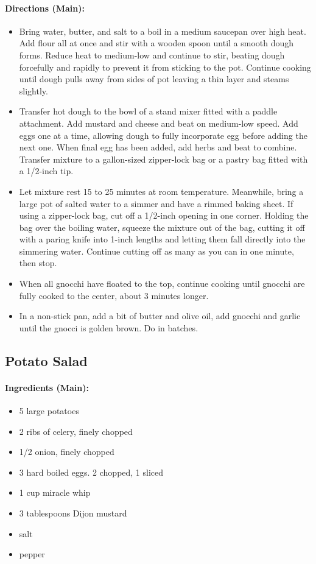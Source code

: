 \documentclass{article}
\begin{document}
\paragraph{Directions (Main):}
\begin{itemize}
    \item Bring water, butter, and salt to a boil in a medium saucepan over high heat. Add flour all at once and stir with a wooden spoon until a smooth dough forms. Reduce heat to medium-low and continue to stir, beating dough forcefully and rapidly to prevent it from sticking to the pot. Continue cooking until dough pulls away from sides of pot leaving a thin layer and steams slightly.
    \item Transfer hot dough to the bowl of a stand mixer fitted with a paddle attachment. Add mustard and cheese and beat on medium-low speed. Add eggs one at a time, allowing dough to fully incorporate egg before adding the next one. When final egg has been added, add herbs and beat to combine. Transfer mixture to a gallon-sized zipper-lock bag or a pastry bag fitted with a 1/2-inch tip.
    \item Let mixture rest 15 to 25 minutes at room temperature. Meanwhile, bring a large pot of salted water to a simmer and have a rimmed baking sheet. If using a zipper-lock bag, cut off a 1/2-inch opening in one corner. Holding the bag over the boiling water, squeeze the mixture out of the bag, cutting it off with a paring knife into 1-inch lengths and letting them fall directly into the simmering water. Continue cutting off as many as you can in one minute, then stop.
    \item When all gnocchi have floated to the top, continue cooking until gnocchi are fully cooked to the center, about 3 minutes longer.
    \item In a non-stick pan, add a bit of butter and olive oil, add gnocchi and garlic until the gnocci is golden brown. Do in batches.
\end{itemize} 

\subsection{Potato Salad} 

\paragraph{Ingredients (Main):}
\begin{itemize}
    \item 5 large potatoes
    \item 2 ribs of celery, finely chopped
    \item 1/2 onion, finely chopped
    \item 3 hard boiled eggs. 2 chopped, 1 sliced
    \item 1 cup miracle whip
    \item 3 tablespoons Dijon mustard
    \item salt
    \item pepper
\end{itemize}  
\end{document}
